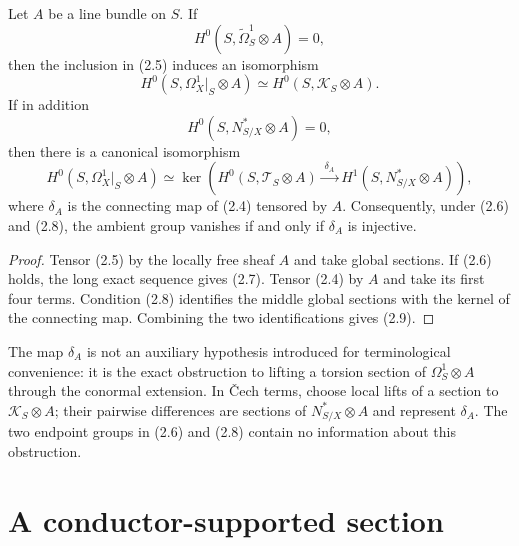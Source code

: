 \begin{proposition}
\label{prop:criterion}
Let $A$ be a line bundle on $S$.  If
\[
 H^0(S,\widetilde\Omega^1_S\otimes A)=0,
 \tag{2.6}
\]
then the inclusion in (2.5) induces an isomorphism
\[
 H^0(S,\Omega^1_X|_S\otimes A)
 \simeq H^0(S,\mathscr K_S\otimes A).
 \tag{2.7}
\]
If in addition
\[
 H^0(S,N^*_{S/X}\otimes A)=0,
 \tag{2.8}
\]
then there is a canonical isomorphism
\[
 H^0(S,\Omega^1_X|_S\otimes A)
 \simeq \ker\!\left(
 H^0(S,\mathscr T_S\otimes A)
 \xrightarrow{\;\delta_A\;}
 H^1(S,N^*_{S/X}\otimes A)
 \right),
 \tag{2.9}
\]
where $\delta_A$ is the connecting map of (2.4) tensored by $A$.
Consequently, under (2.6) and (2.8), the ambient group vanishes if and only
if $\delta_A$ is injective.
\end{proposition}

\begin{proof}
Tensor (2.5) by the locally free sheaf $A$ and take global sections.  If
(2.6) holds, the long exact sequence gives (2.7).  Tensor (2.4) by $A$ and
take its first four terms.  Condition (2.8) identifies the middle global
sections with the kernel of the connecting map.  Combining the two
identifications gives (2.9).
\end{proof}

\begin{remark}
The map $\delta_A$ is not an auxiliary hypothesis introduced for
terminological convenience: it is the exact obstruction to lifting a torsion
section of $\Omega^1_S\otimes A$ through the conormal extension.  In
\v{C}ech terms, choose local lifts of a section to
$\mathscr K_S\otimes A$; their pairwise differences are sections of
$N^*_{S/X}\otimes A$ and represent $\delta_A$.  The two endpoint groups in
(2.6) and (2.8) contain no information about this obstruction.
\end{remark}

\section{A conductor-supported section}

